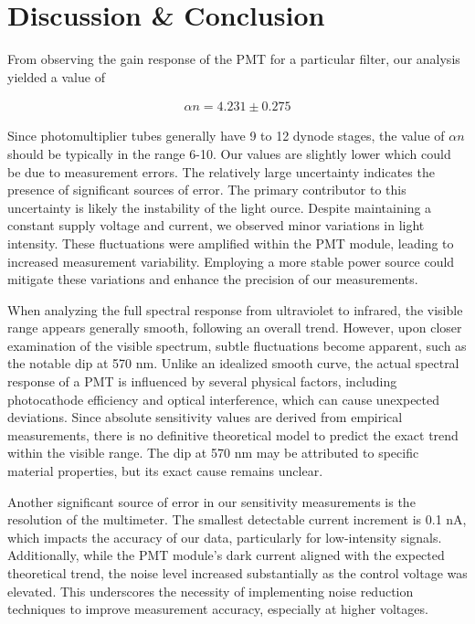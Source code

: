 \section{Discussion \& Conclusion}
From observing the gain response of the PMT for a particular filter, our analysis yielded a value of 

\begin{align*}
    \alpha n = 4.231 \pm 0.275
\end{align*}

Since photomultiplier tubes generally have 9 to 12 dynode stages, the value of $\alpha n$ should be typically in the range 6-10. Our values are slightly lower which could be due to measurement errors. The relatively large uncertainty indicates the presence of significant sources of error. The primary contributor to this uncertainty is likely the instability of the light  ource. Despite maintaining a constant supply voltage and current, we observed minor variations in light intensity. These fluctuations were amplified within the PMT module, leading to increased measurement variability. Employing a more stable power source could mitigate these variations and enhance the precision of our measurements. 

When analyzing the full spectral response from ultraviolet to infrared, the visible range appears generally smooth, following an overall trend. However, upon closer examination of the visible spectrum, subtle fluctuations become apparent, such as the notable dip at 570 nm. Unlike an idealized smooth curve, the actual spectral response of a PMT is influenced by several physical factors, including photocathode efficiency and optical interference, which can cause unexpected deviations.  Since absolute sensitivity values are derived from empirical measurements, there is no definitive theoretical model to predict the exact trend within the visible range. The dip at 570 nm may be attributed to specific material properties, but its exact cause remains unclear.

Another significant source of error in our sensitivity measurements is the resolution of the multimeter. The smallest detectable current increment is 0.1 nA, which impacts the accuracy of our data, particularly for low-intensity signals. Additionally, while the PMT module’s dark current aligned with the expected theoretical trend, the noise level increased substantially as the control voltage was elevated. This underscores the necessity of implementing noise reduction techniques to improve measurement accuracy, especially at higher voltages.

